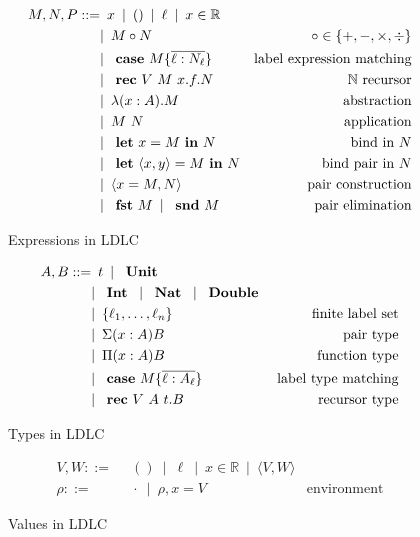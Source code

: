 \begin{figure}
\begin{align*}
 M,N,P ::=
    & \enspace x \enspace|\enspace
      () \enspace|\enspace
      \ell \enspace|\enspace
      x \in \mathbb{R} \\
    & |\enspace M \circ N & \circ \in \{+,-,\times,\div\} \\
    & |\enspace \text{ \textbf{case} } M \{\overline{\ell : N_\ell}\} & \text{label expression matching} \\
    & |\enspace \text{ \textbf{rec} } V~M~x.f.N & \mathbb{N}\text{ recursor} \\
    & |\enspace \lambda (x : A).M & \text{abstraction} \\
    & |\enspace M~N & \text{application}\\
    & |\enspace \text{ \textbf{let} } x = M \text{ \textbf{in} } N & \text{bind in $N$}\\
    & |\enspace \text{ \textbf{let} } \langle x, y \rangle = M \text{ \textbf{in} } N & \text{bind pair in $N$} \\
    & |\enspace \langle x = M, N \rangle & \text{pair construction}\\
    & |\enspace \text{ \textbf{fst} } M \enspace|\enspace \text{ \textbf{snd} } M & \text{pair elimination}
\end{align*}
\caption{Expressions in LDLC}
\label{fig:ldlc-expressions}
\end{figure}

\begin{figure}
\begin{align*}
 A, B ::=
    & \enspace t \enspace|\enspace
      \text{ \textbf{Unit} }
    \\ &  |\enspace \text{ \textbf{Int} } \enspace|\enspace
      \text{ \textbf{Nat} } \enspace|\enspace
      \text{ \textbf{Double} } \\
    & |\enspace \{ \ell_1, \dots, \ell_n \} & \text{finite label set} \\
    & |\enspace \Sigma(x:A)B & \text{pair type} \\
    & |\enspace \Pi(x:A)B & \text{function type} \\
    & |\enspace \text{ \textbf{case} } M \{\overline{\ell : A_\ell}\} & \text{label type matching} \\
    & |\enspace \text{ \textbf{rec} } V~A~t.B & \text{recursor type}
\end{align*}
\caption{Types in LDLC}
\label{fig:ldlc-types}
\end{figure}

\begin{figure}
\begin{align*}
    V, W ::=
    & \enspace () \enspace|\enspace
      \ell \enspace|\enspace
      x \in \mathbb{R} \enspace
     |\enspace \langle V, W \rangle \\
    \rho ::= & \enspace \cdot \enspace | \enspace \rho, x = V & \text{environment}
\end{align*}
\caption{Values in LDLC}
\label{fig:ldlc-values}
\end{figure}

